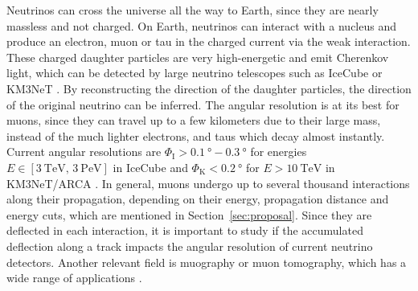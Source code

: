 \documentclass[pdflatex, sn-mathphys]{sn-jnl}%
\theoremstyle{thmstyleone}%
\theoremstyle{thmstyletwo}%
\theoremstyle{thmstylethree}%
\begin{document}
Neutrinos can cross the universe all the way to Earth, since they are 
nearly massless and not charged. On Earth, neutrinos can interact 
with a nucleus and produce an electron, muon or tau in the charged current 
via the weak interaction. These charged daughter particles are very 
high-energetic and emit Cherenkov light, which can be detected 
by large neutrino telescopes such as IceCube \cite{IceCube_Instrumentation} or 
KM3NeT \cite{KM3NeT_Design}. 
By reconstructing the direction of the daughter particles, the direction 
of the original neutrino can be inferred. The angular resolution is at its 
best for muons, since they can travel up to a few kilometers due to their 
large mass, instead of the much lighter electrons, and taus which decay almost 
instantly. Current angular resolutions are 
$\Phi_{\text{I}} > \SI{0.1}{\degree} - \SI{0.3}{\degree}$ for energies 
$E \in [\SI{3}{\tera\electronvolt},\,\SI{3}{\peta\electronvolt}]$ in IceCube 
\cite{IceCube_Resolution2021} 
and 
$\Phi_{\text{K}} < \SI{0.2}{\degree}$ for $E > \SI{10}{\tera\electronvolt}$ in 
KM3NeT/ARCA \cite{KM3NeT_Resolution2021}.
In general, muons undergo up to several thousand interactions along their propagation, depending 
on their energy, propagation distance and energy cuts, which are mentioned in 
Section~\ref{sec:proposal}.
Since they 
are deflected in each interaction, it is important to study if the accumulated 
deflection along a track impacts the angular resolution of current 
neutrino detectors. 
Another relevant field is muography or muon tomography, which has a wide range of applications \cite{muography}. 

\end{document}
